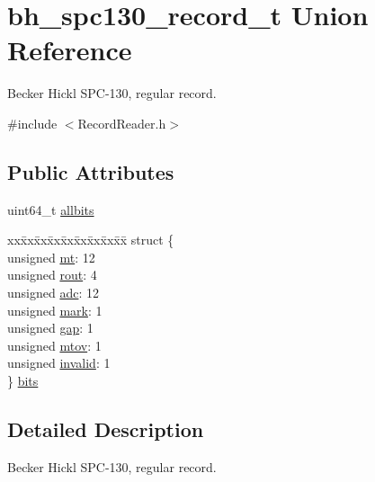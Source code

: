 \hypertarget{unionbh__spc130__record__t}{}\section{bh\+\_\+spc130\+\_\+record\+\_\+t Union Reference}
\label{unionbh__spc130__record__t}


Becker Hickl S\+P\+C-\/130, regular record.  




{\ttfamily \#include $<$Record\+Reader.\+h$>$}

\subsection*{Public Attributes}
\begin{DoxyCompactItemize}
\item 
uint64\+\_\+t \hyperlink{unionbh__spc130__record__t_a2014a3168433f028cac1f0723ce921b2}{allbits}
\item 
\begin{tabbing}
xx\=xx\=xx\=xx\=xx\=xx\=xx\=xx\=xx\=\kill
struct \{\\
\>unsigned \hyperlink{unionbh__spc130__record__t_a7fdaa2e24967b55ea29a6cabb8578a6c}{mt}: 12\\
\>unsigned \hyperlink{unionbh__spc130__record__t_aecbfa30dcdb602237b62d54024ac2ca5}{rout}: 4\\
\>unsigned \hyperlink{unionbh__spc130__record__t_a695247010c82993f945abd80deee7556}{adc}: 12\\
\>unsigned \hyperlink{unionbh__spc130__record__t_a9bcb0274d4ae84d4bbba836312011b27}{mark}: 1\\
\>unsigned \hyperlink{unionbh__spc130__record__t_a7fb7c206e2cc7e8fee8a0513155a1fcf}{gap}: 1\\
\>unsigned \hyperlink{unionbh__spc130__record__t_ae03447ff73fd2a2db0a00c3f7fe77171}{mtov}: 1\\
\>unsigned \hyperlink{unionbh__spc130__record__t_a29ee8e65017dce674a1db7b719313bef}{invalid}: 1\\
\} \hyperlink{unionbh__spc130__record__t_aa332796c04d377ab78ac81de809866ac}{bits}\\

\end{tabbing}\end{DoxyCompactItemize}


\subsection{Detailed Description}
Becker Hickl S\+P\+C-\/130, regular record. 

